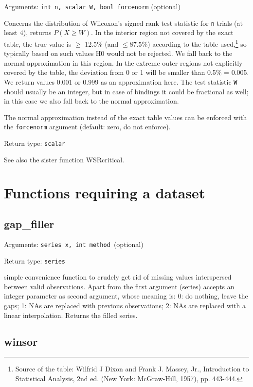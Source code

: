 \documentclass[11pt,english]{article}
\begin{document}
Arguments: \texttt{int n, scalar W, bool forcenorm} (optional)

Concerns the distribution of Wilcoxon's signed rank test statistic for
\texttt{n} trials (at least 4), returns $P(X\geq W)$. In the interior
region not covered by the exact table, the true value is $\geq$ 12.5\%
(and $\leq$87.5\%) according to the table used,\footnote{Source of the
  table: Wilfrid J Dixon and Frank J. Massey, Jr., Introduction to
  Statistical Analysis, 2nd ed. (New York: McGraw-Hill, 1957), pp.
  443-444.} so typically based on such values H0 would not be
rejected. We fall back to the normal approximation in this region. In
the extreme outer regions not explicitly covered by the table, the
deviation from 0 or 1 will be smaller than 0.5\% = 0.005. We return
values 0.001 or 0.999 as an approximation here. The test statistic
\texttt{W} should usually be an integer, but in case of bindings it
could be fractional as well; in this case we also fall back to the
normal approximation.

The normal approximation instead of the exact table values can be
enforced with the \texttt{forcenorm} argument (default: zero, do not
enforce).

Return type: \texttt{scalar}

See also the sister function WSRcritical.

\section{Functions requiring a dataset}

\subsection{gap\_filler}

Arguments: \texttt{series x, int method }(optional)\texttt{ }

\noindent Return type: \texttt{series}

simple convenience function to crudely get rid of missing values interspersed
between valid observations. Apart from the first argument (series)
accepts an integer parameter as second argument, whose meaning is:
0: do nothing, leave the gaps; 1: NAs are replaced with previous observations;
2: NAs are replaced with a linear interpolation. Returns the filled
series. 

\subsection{winsor}
\end{document}
